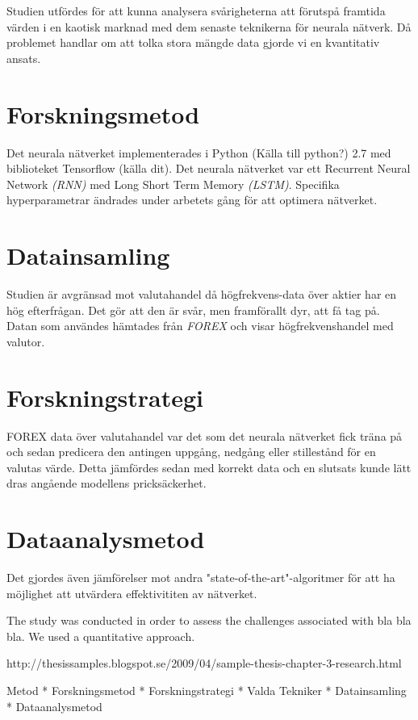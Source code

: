 Studien utfördes för att kunna analysera svårigheterna att förutspå framtida värden i en kaotisk marknad med dem senaste teknikerna för neurala nätverk. Då problemet handlar om att tolka stora mängde data gjorde vi en kvantitativ ansats. 


\section{Forskningsmetod} 
Det neurala nätverket implementerades i Python (Källa till python?) 2.7 med biblioteket Tensorflow (källa dit). Det neurala nätverket var ett Recurrent Neural Network \textit{(RNN)} med Long Short Term Memory \textit{(LSTM)}. Specifika hyperparametrar ändrades under arbetets gång för att optimera nätverket. 

\section{Datainsamling} 
Studien är avgränsad mot valutahandel då högfrekvens-data över aktier har en hög efterfrågan. Det gör att den är svår, men framförallt dyr, att få tag på. Datan som användes hämtades från \textit{FOREX} och visar högfrekvenshandel med valutor. 

\section{Forskningstrategi} 
FOREX data över valutahandel var det som det neurala nätverket fick träna på och sedan predicera den antingen uppgång, nedgång eller stillestånd för en valutas värde. Detta jämfördes sedan med korrekt data och en slutsats kunde lätt dras angående modellens pricksäckerhet. 

\section{Dataanalysmetod} 
Det gjordes även jämförelser mot andra "state-of-the-art"-algoritmer för att ha möjlighet att utvärdera effektivititen av nätverket. 





The study was conducted in order to assess the challenges associated with bla bla bla. We used a quantitative approach.


http://thesissamples.blogspot.se/2009/04/sample-thesis-chapter-3-research.html


Metod
* Forskningsmetod
* Forskningstrategi
* Valda Tekniker
* Datainsamling
* Dataanalysmetod

